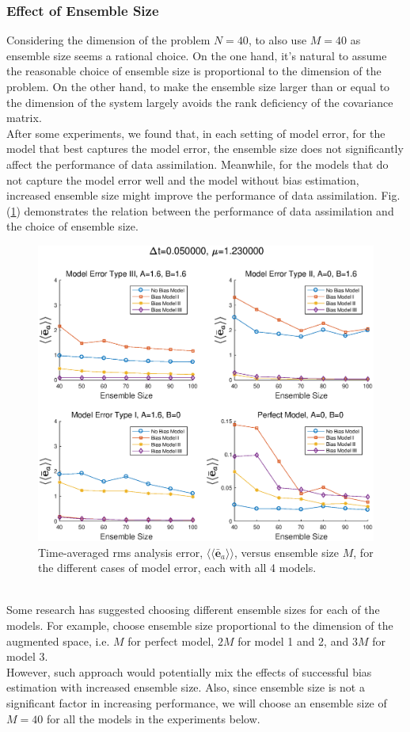 \documentclass[twocolumn]{article}
\begin{document}
\subsubsection{Effect of Ensemble Size}
Considering the dimension of the problem $N=40$, to also use $M=40$ as ensemble size seems a rational choice. On the one hand, it's natural to assume the reasonable choice of ensemble size is proportional to the dimension of the problem. On the other hand, to make the ensemble size larger than or equal to the dimension of the system largely avoids the rank deficiency of the covariance matrix.\\
After some experiments, we found that, in each setting of model error, for the model that best captures the model error, the ensemble size does not significantly affect the performance of data assimilation. Meanwhile, for the models that do not capture the model error well and the model without bias estimation, increased ensemble size might improve the performance of data assimilation. Fig.(\ref{AErrVsEns}) demonstrates the relation between the performance of data assimilation and the choice of ensemble size.
\begin{figure} 
\centering
\includegraphics[scale=0.3]{Figures/AErrVsEns1}
\caption{Time-averaged rms analysis error, $\langle\langle\bar{\pmb{e}}_a\rangle\rangle$, versus ensemble size $M$, for the different cases of model error, each with all 4 models.}
\label{AErrVsEns}
\end{figure}\\
Some research has suggested choosing different ensemble sizes for each of the models. For example, choose ensemble size proportional to the dimension of the augmented space, i.e. $M$ for perfect model, $2M$ for model 1 and 2, and $3M$ for model 3.\\
However, such approach would potentially mix the effects of successful bias estimation with increased ensemble size. Also, since ensemble size is not a significant factor in increasing performance, we will choose an ensemble size of $M=40$ for all the models in the experiments below.
\end{document}

